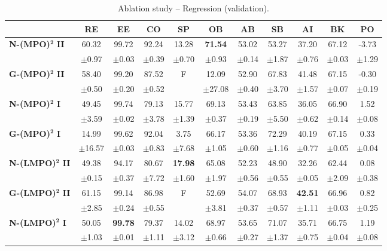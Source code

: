 \begin{table}[ht]
\centering
\small
\caption{Ablation study -- Regression (validation).}
\label{tab:ablation_regression}
\begin{tabular}{lcccccccccc}
\toprule
& RE & EE & CO & SP & OB & AB & SB & AI & BK & PO \\
\midrule
\textbf{N-(MPO)}$\bm{^2}$ \textbf{II} & 60.32 & 99.72 & 92.24 & 13.28 & \textbf{71.54} & 53.02 & 53.27 & 37.20 & 67.12 & -3.73 \\
 & $\pm$0.97 & $\pm$0.03 & $\pm$0.39 & $\pm$0.70 & $\pm$0.93 & $\pm$0.14 & $\pm$1.87 & $\pm$0.76 & $\pm$0.03 & $\pm$1.29 \\
\midrule
\textbf{G-(MPO)}$\bm{^2}$ \textbf{II} & 58.40 & 99.20 & 87.52 & F & 12.09 & 52.90 & 67.83 & 41.48 & 67.15 & -0.30 \\
 & $\pm$0.50 & $\pm$0.20 & $\pm$0.52 &  & $\pm$27.08 & $\pm$0.40 & $\pm$3.70 & $\pm$1.57 & $\pm$0.07 & $\pm$0.19 \\
\midrule
\textbf{N-(MPO)}$\bm{^2}$ \textbf{I} & 49.45 & 99.74 & 79.13 & 15.77 & 69.13 & 53.43 & 63.85 & 36.05 & 66.90 & 1.52 \\
 & $\pm$3.59 & $\pm$0.02 & $\pm$3.78 & $\pm$1.39 & $\pm$0.37 & $\pm$0.19 & $\pm$5.50 & $\pm$0.62 & $\pm$0.14 & $\pm$0.08 \\
\midrule
\textbf{G-(MPO)}$\bm{^2}$ \textbf{I} & 14.99 & 99.62 & 92.04 & 3.75 & 66.17 & 53.36 & 72.29 & 40.19 & 67.15 & 0.33 \\
 & $\pm$16.57 & $\pm$0.03 & $\pm$0.83 & $\pm$7.68 & $\pm$1.05 & $\pm$0.60 & $\pm$1.16 & $\pm$0.77 & $\pm$0.05 & $\pm$0.04 \\
\midrule
\textbf{N-(LMPO)}$\bm{^2}$ \textbf{II} & 49.38 & 94.17 & 80.67 & \textbf{17.98} & 65.08 & 52.23 & 48.90 & 32.26 & 62.44 & 0.08 \\
 & $\pm$0.15 & $\pm$0.37 & $\pm$7.72 & $\pm$1.60 & $\pm$1.97 & $\pm$0.56 & $\pm$0.55 & $\pm$0.05 & $\pm$2.09 & $\pm$0.38 \\
\midrule
\textbf{G-(LMPO)}$\bm{^2}$ \textbf{II} & 61.15 & 99.14 & 86.98 & F & 52.69 & 54.07 & 68.93 & \textbf{42.51} & 66.96 & 0.82 \\
 & $\pm$2.85 & $\pm$0.24 & $\pm$0.55 &  & $\pm$3.81 & $\pm$0.37 & $\pm$0.57 & $\pm$1.11 & $\pm$0.03 & $\pm$0.25 \\
\midrule
\textbf{N-(LMPO)}$\bm{^2}$ \textbf{I} & 50.05 & \textbf{99.78} & 79.37 & 14.02 & 68.97 & 53.65 & 71.07 & 35.71 & 66.75 & 1.19 \\
 & $\pm$1.03 & $\pm$0.01 & $\pm$1.11 & $\pm$3.12 & $\pm$0.66 & $\pm$0.27 & $\pm$1.37 & $\pm$0.75 & $\pm$0.04 & $\pm$0.08 \\

\end{tabular}
\end{table}
